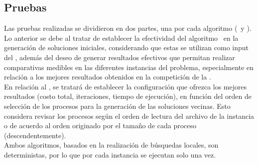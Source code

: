 \documentclass[../informe2.tex]{subfiles}
\begin{document}
\subsection{Pruebas}
\label{sub:Pruebas}
Las pruebas realizadas se dividieron en dos partes, una por cada algoritmo (\greedy\ y \hillc). Lo anterior se debe al tratar de establecer la efectividad del algoritmo \greedy\ en la generación de soluciones iniciales, considerando que estas se utilizan como input del \hillc, además del deseo de generar resultados efectivos que permitan realizar comparativas medibles en las diferentes instancias del problema, especialmente en relación a los mejores resultados obtenidos en la competición de la \roadef.\\
En relación al \hillc, se tratará de establecer la configuración que ofrezca los mejores resultados (costo total, iteraciones, tiempo de ejecución), en función del orden de selección de los procesos para la generación de las soluciones vecinas. Esto considera revisar los procesos según el orden de lectura del archivo de la instancia o de acuerdo al orden originado por el tamaño de cada proceso (descendentemente).\\
Ambos algoritmos, basados en la realización de búsquedas locales, son deterministas, por lo que por cada instancia se ejecutan solo una vez.
\end{document}
